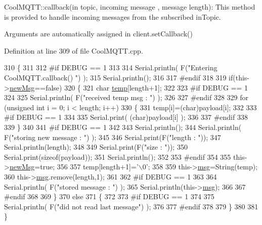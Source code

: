 Cool\+M\+Q\+T\+T\+::callback(in topic, incoming message , message length)\+: This method is provided to handle incoming messages from the subscribed in\+Topic.

Arguments are automatically assigned in client.\+set\+Callback() 

Definition at line 309 of file Cool\+M\+Q\+T\+T.\+cpp.


\begin{DoxyCode}
310 \{
311 
312 \textcolor{preprocessor}{#if DEBUG == 1}
313 
314     Serial.println( F(\textcolor{stringliteral}{"Entering CoolMQTT.callback() "}) );
315     Serial.println();
316 
317 \textcolor{preprocessor}{#endif }
318 
319     \textcolor{keywordflow}{if}(this->\hyperlink{class_cool_m_q_t_t_a3240388137b885775aadf38e96b24c6b}{newMsg}==\textcolor{keyword}{false})
320     \{
321         \textcolor{keywordtype}{char} \hyperlink{_irene3000_8h_a5905d48604152cf57aa6bfa087b49173}{temp}[length+1];
322 
323 \textcolor{preprocessor}{    #if DEBUG == 1}
324 
325         Serial.println( F(\textcolor{stringliteral}{"received temp msg : "}) );
326         
327 \textcolor{preprocessor}{    #endif}
328         
329         \textcolor{keywordflow}{for} (\textcolor{keywordtype}{unsigned} \textcolor{keywordtype}{int} i = 0; i < length; i++) 
330         \{
331             temp[i]=(char)payload[i];
332         
333 \textcolor{preprocessor}{        #if DEBUG == 1 }
334 
335             Serial.print( (\textcolor{keywordtype}{char})payload[i] );
336         
337 \textcolor{preprocessor}{        #endif}
338 
339         \}
340     
341 \textcolor{preprocessor}{    #if DEBUG == 1 }
342 
343         Serial.println();
344         Serial.println( F(\textcolor{stringliteral}{"storing new message : "}) );
345 
346         Serial.print(F(\textcolor{stringliteral}{"length : "}));
347         Serial.println(length);
348         
349         Serial.print(F(\textcolor{stringliteral}{"size : "}));
350         Serial.print(\textcolor{keyword}{sizeof}(payload));
351         Serial.println();
352     
353 \textcolor{preprocessor}{    #endif}
354 
355         this->\hyperlink{class_cool_m_q_t_t_a3240388137b885775aadf38e96b24c6b}{newMsg}=\textcolor{keyword}{true};
356 
357         temp[length+1]=\textcolor{charliteral}{'\(\backslash\)0'};
358 
359         this->\hyperlink{class_cool_m_q_t_t_af6b19e7074dbbb4ae493c44dcb53f7ff}{msg}=String(temp);
360         this->\hyperlink{class_cool_m_q_t_t_af6b19e7074dbbb4ae493c44dcb53f7ff}{msg}.remove(length,1);
361     
362 \textcolor{preprocessor}{    #if DEBUG == 1 }
363 
364         Serial.println( F(\textcolor{stringliteral}{"stored message : "}) );
365         Serial.println(this->\hyperlink{class_cool_m_q_t_t_af6b19e7074dbbb4ae493c44dcb53f7ff}{msg});
366     
367 \textcolor{preprocessor}{    #endif}
368 
369     \}
370     \textcolor{keywordflow}{else}
371     \{
372     
373 \textcolor{preprocessor}{    #if DEBUG == 1}
374 
375         Serial.println( F(\textcolor{stringliteral}{"did not read last message"}) );
376     
377 \textcolor{preprocessor}{    #endif }
378         
379     \}
380 
381 \}
\end{DoxyCode}
